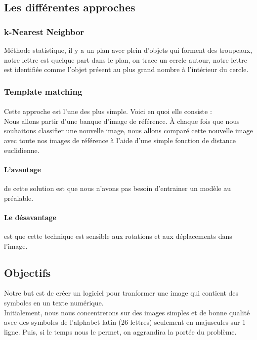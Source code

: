 \documentclass[a4paper]{article}
\begin{document}
		\subsection{Les différentes approches}
			\subsubsection{k-Nearest Neighbor}
				Méthode statistique, il y a un plan avec plein d'objets qui forment des troupeaux, notre lettre est quelque part dans le plan, on trace un cercle autour, notre lettre est identifiée comme l'objet présent au plus grand nombre à l'intérieur du cercle.
			\subsubsection{Template matching} 
				\paragraph{}
					Cette approche est l'une des plus simple. Voici en quoi elle consiste :\\Nous allons partir d'une banque d'image de référence. À chaque fois que nous souhaitons classifier une nouvelle image, nous allons comparé cette nouvelle image avec toute nos images de référence à l'aide d'une simple fonction de distance euclidienne.
				\paragraph{L'avantage} de cette solution est que nous n'avons pas besoin d'entrainer un modèle au préalable.
				\paragraph{Le désavantage} est que cette technique est sensible aux rotations et aux déplacements dans l'image.%
		\subsection{Objectifs}
			Notre but est de créer un logiciel pour tranformer une image qui contient des symboles en un texte numérique.\\
			Initialement, nous nous concentrerons sur des images simples et de bonne qualité avec des symboles de l'alphabet latin (26 lettres) seulement en majuscules sur 1 ligne. Puis, si le temps nous le permet, on aggrandira la portée du problème.
\end{document}
